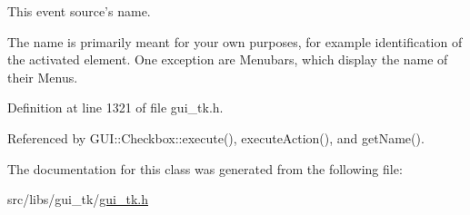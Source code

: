 This event source's name. 

The name is primarily meant for your own purposes, for example identification of the activated element. One exception are Menubars, which display the name of their Menus. 

Definition at line 1321 of file gui\-\_\-tk.\-h.



Referenced by G\-U\-I\-::\-Checkbox\-::execute(), execute\-Action(), and get\-Name().



The documentation for this class was generated from the following file\-:\begin{DoxyCompactItemize}
\item 
src/libs/gui\-\_\-tk/\hyperlink{gui__tk_8h}{gui\-\_\-tk.\-h}\end{DoxyCompactItemize}
